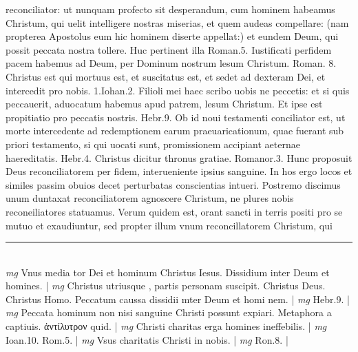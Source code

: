 \documentclass{article}
\begin{document}
\begin{pages}
reconciliator: ut nunquam profecto sit desperandum, cum hominem habeamus Christum, qui uelit intelligere nostras miserias, et quem audeas compellare: (nam propterea Apostolus eum hic hominem diserte appellat:) et eundem Deum, qui possit peccata nostra    tollere. Huc pertinent illa Roman.5. Iustificati perfidem pacem habemus ad Deum,    per Dominum nostrum lesum Christum. Roman. 8. Christus est qui mortuus est, et suscitatus est, et sedet ad dexteram Dei, et intercedit pro nobis. 1.Iohan.2. Filioli mei    haec scribo uobis ne peccetis: et si quis peccauerit, aduocatum habemus apud patrem, lesum Christum. Et ipse est propitiatio pro peccatis nostris. Hebr.9. Ob id    noui testamenti conciliator est, ut morte intercedente ad redemptionem earum praeuaricationum, quae fuerant sub priori testamento, si qui uocati sunt, promissionem accipiant aeternae haereditatis. Hebr.4. Christus dicitur thronus gratiae. Romanor.3. Hunc proposuit Deus reconciliatorem per fidem, interueniente ipsius sanguine. In hos ergo locos et similes passim obuios decet perturbatas conscientias intueri. Postremo discimus unum duntaxat reconciliatorem agnoscere Christum, ne plures nobis reconeiliatores statuamus. Verum quidem est, orant sancti in terris positi pro se mutuo et exaudiuntur, sed propter illum vnum reconcillatorem Christum, qui  \pend
\vspace{0.5cm}\noindent
\vspace{0.2cm}\rule{1cm}{0.2pt}\\ 
\hspace{0.2cm}\textit{mg}
\footnotesize Vnus media tor Dei et hominum Christus Iesus. Dissidium inter Deum et homines. 
\normalsize| 
\hspace{0.2cm}\textit{mg}
\footnotesize Christus utriusque , partis personam suscipit. Christus Deus. Christus Homo. Peccatum caussa dissidii mter Deum et homi nem. 
\normalsize| 
\hspace{0.2cm}\textit{mg}
\footnotesize Hebr.9. 
\normalsize| 
\hspace{0.2cm}\textit{mg}
\footnotesize Peccata hominum non nisi sanguine Christi possunt expiari. Metaphora a captiuis. ἀντίλυτρον quid. 
\normalsize| 
\hspace{0.2cm}\textit{mg}
\footnotesize Christi charitas erga homines ineffebilis. 
\normalsize| 
\hspace{0.2cm}\textit{mg}
\footnotesize Ioan.10. Rom.5. 
\normalsize| 
\hspace{0.2cm}\textit{mg}
\footnotesize Vsus charitatis Christi in nobis. 
\normalsize| 
\hspace{0.2cm}\textit{mg}
\footnotesize Ron.8. 
\normalsize| 

\end{pages}
\end{document}
